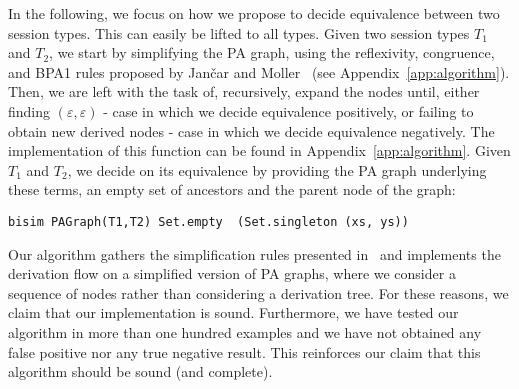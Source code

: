 In the following, we focus on how we propose to decide equivalence between two session types. This can easily be lifted to all types. Given two session types $T_1$ and $T_2$, we start by simplifying the PA graph, using the reflexivity, congruence, and BPA1 rules proposed by Jan{\v{c}}ar and Moller~\cite{janvcar1999techniques} (see Appendix~\ref{app:algorithm}). Then, we are left with the task of, recursively, expand the nodes until, either finding $(\varepsilon, \varepsilon)$ - case in which we decide equivalence positively, or failing to obtain new derived nodes - case in which we decide equivalence negatively. The implementation of this function can be found in Appendix~\ref{app:algorithm}. Given $T_1$ and $T_2$, we decide on its equivalence by providing the PA graph underlying these terms, an empty set of ancestors and the parent node of the graph:
\begin{lstlisting}
bisim PAGraph(T1,T2) Set.empty  (Set.singleton (xs, ys))
\end{lstlisting}

Our algorithm gathers the simplification rules presented in~\cite{janvcar1999techniques} and implements the derivation flow on a simplified version of PA graphs, where we consider a sequence of nodes rather than considering a derivation tree. For these reasons, we claim that our implementation is sound. Furthermore, we have tested our algorithm in more than one hundred examples and we have not obtained any false positive nor any true negative result. This reinforces our claim that this algorithm should be sound (and complete).